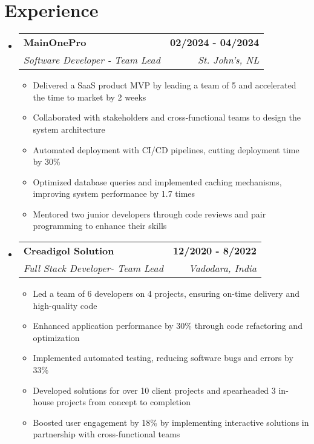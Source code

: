 \documentclass[letterpaper,11pt]{article}
\makeatletter
\newcommand{\resumeItem}[1]{
  \item\small{
    {#1 \vspace{-2pt}}
  }
}
\newcommand{\resumeSubheading}[4]{
  \vspace{-2pt}\item
    \begin{tabular*}{1.0\textwidth}[t]{l@{\extracolsep{\fill}}r}
      \textbf{#1} & \textbf{\small #2} \\
      \textit{\small#3} & \textit{\small #4} \\
    \end{tabular*}\vspace{-7pt}
}
\newcommand{\resumeSubHeadingListStart}{\begin{itemize}[leftmargin=0.0in, label={}]}
\newcommand{\resumeSubHeadingListEnd}{\end{itemize}}
\newcommand{\resumeItemListStart}{\begin{itemize}}
\newcommand{\resumeItemListEnd}{\end{itemize}\vspace{-5pt}}
\makeatother
\begin{document}
\section{Experience}
  \resumeSubHeadingListStart
    \resumeSubheading
      {MainOnePro}{02/2024 - 04/2024}
      {Software Developer - Team Lead}{St. John's, NL}
      \resumeItemListStart
        \resumeItem{Delivered a SaaS product MVP by leading a team of 5 and accelerated the time to market by 2 weeks}
        \resumeItem{Collaborated with stakeholders and cross-functional teams to design the system architecture}
        \resumeItem{Automated deployment with CI/CD pipelines, cutting deployment time by 30\%}
        \resumeItem{Optimized database queries and implemented caching mechanisms, improving system performance by 1.7 times}
        \resumeItem{Mentored two junior developers through code reviews and pair programming to enhance their skills}
      \resumeItemListEnd
    \resumeSubheading
      {Creadigol Solution}{12/2020 - 8/2022}
      {Full Stack Developer- Team Lead}{Vadodara, India}
      \resumeItemListStart
        \resumeItem{Led a team of 6 developers on 4 projects, ensuring on-time delivery and high-quality code}
        \resumeItem{Enhanced application performance by 30\% through code refactoring and optimization}
        \resumeItem{Implemented automated testing, reducing software bugs and errors by 33\%}
        \resumeItem{Developed solutions for over 10 client projects and spearheaded 3 in-house projects from concept to completion}
        \resumeItem{Boosted user engagement by 18\% by implementing interactive solutions in partnership with cross-functional teams}
      \resumeItemListEnd
  \resumeSubHeadingListEnd
\vspace{-16pt}
\end{document}
